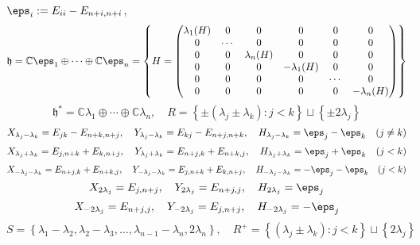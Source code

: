 \documentclass[reqno]{amsart} 
\begin{document}
$\eps_i := E_{i i} - E_{n+i,n+i}$,
\begin{equation*}
  \mathfrak{h} = \mathbb{C} \eps_1 \oplus \dotsb \oplus \mathbb{C} \eps_n = \left\{ H = 
\begin{pmatrix}
    \lambda_1(H) & 0 & 0 & 0 & 0 & 0 \\
    0 & \dotsb & 0 & 0 & 0 & 0 \\
    0 & 0 & \lambda_n(H) & 0 & 0 & 0 \\
    0 & 0 & 0 & -\lambda_1(H) & 0 & 0\\
    0 & 0 & 0 & 0 & \dotsb & 0 \\
    0 & 0 & 0 & 0 & 0 & -\lambda_n(H)
  \end{pmatrix}
\right\}
\end{equation*}
\begin{equation*}
  \mathfrak{h}^* = \mathbb{C} \lambda_1 \oplus \dotsb \oplus \mathbb{C} \lambda_n, \quad R = \left\{ \pm (\lambda_j \pm \lambda_k) : j < k \right\} \sqcup \left\{ \pm 2 \lambda_j \right\}
\end{equation*}
\begin{equation*}
  X_{\lambda_j - \lambda_k} = E_{j k} - E_{n+k,n+j}, \quad Y_{\lambda_j - \lambda_k} = E_{k j} - E_{n+j,n+k}, \quad H_{\lambda_j - \lambda_k} = \eps_j - \eps_k \quad (j \neq k)
\end{equation*}
\begin{equation*}
  X_{\lambda_j + \lambda_k} = E_{j,n+k} + E_{k,n+j}, \quad Y_{\lambda_j + \lambda_k} = E_{n+j, k} + E_{n+k,j}, \quad H_{\lambda_j + \lambda_k} = \eps_j + \eps_k \quad (j < k)
\end{equation*}
\begin{equation*}
  X_{-\lambda_j - \lambda_k} = E_{n+j,k} + E_{n+k,j}, \quad Y_{-\lambda_j - \lambda_k} = E_{j, n+k} + E_{k,n+j}, \quad H_{-\lambda_j - \lambda_k} = -\eps_j - \eps_k \quad (j < k)
\end{equation*}
\begin{equation*}
  X_{2 \lambda_j} = E_{j,n+j}, \quad Y_{2 \lambda_j} = E_{n+j,j}, \quad H_{2 \lambda_j} = \eps_j
\end{equation*}
\begin{equation*}
  X_{-2 \lambda_j} = E_{n+j,j}, \quad Y_{-2 \lambda_j} = E_{j,n+j}, \quad H_{-2 \lambda_j} = -\eps_j
\end{equation*}
\begin{equation*}
  S = \left\{ \lambda_1 - \lambda_2, \lambda_2 - \lambda_3, \dotsc, \lambda_{n-1} - \lambda_n, 2 \lambda_n \right\}, \quad R^+ = \left\{ (\lambda_j \pm \lambda_k) : j < k \right\} \sqcup \left\{ 2 \lambda_j \right\}
\end{equation*}
\end{document}

